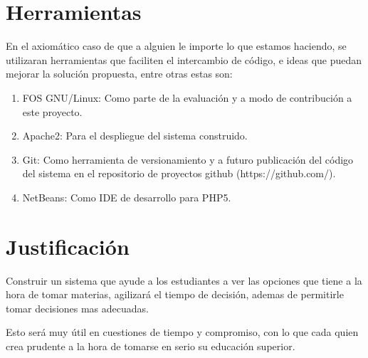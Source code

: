 \documentclass[letter,12pt]{article}
\begin{document}
\section{Herramientas}
En el axiomático caso de que a alguien le importe lo que estamos haciendo, se utilizaran herramientas
que faciliten el intercambio de código, e ideas que puedan mejorar la solución propuesta, entre otras
estas son:

\begin{enumerate}
\item FOS GNU/Linux: Como parte de la evaluación y a modo de contribución a este proyecto.
\item Apache2: Para el despliegue del sistema construido.
\item Git: Como herramienta de versionamiento y a futuro publicación del código del sistema en
el repositorio de proyectos github (https://github.com/).
\item NetBeans: Como IDE de desarrollo para PHP5.
\end{enumerate}

\section{Justificación}
Construir un sistema que ayude a los estudiantes a ver las opciones que tiene a la hora de tomar
materias, agilizará el tiempo de decisión, ademas de permitirle tomar decisiones mas adecuadas.

Esto será muy útil en cuestiones de tiempo y compromiso, con lo que cada quien crea prudente a la
hora de tomarse en serio su educación superior.
\end{document}
